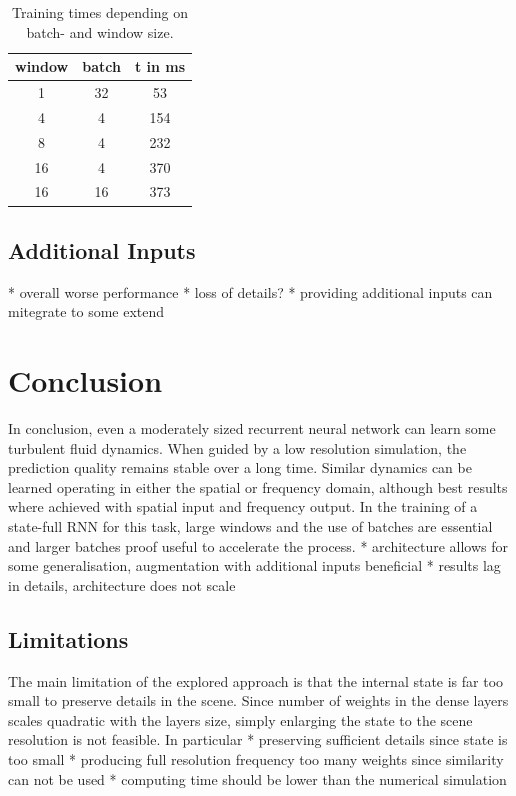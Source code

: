 \documentclass[sigconf]{acmart}
\begin{document}
\begin{table}
	\centering
	\caption{Training times depending on batch- and window size.}
	\label{tab:bwsize}
	\begin{tabular}{ccc}
		\hline
		window  & batch  & t in ms \\ \hline
		1  & 32 &   53    \\
		4  & 4  &   154   \\
		8  & 4  &   232   \\
		16 & 4  &   370   \\
		16 & 16 &   373   \\ \hline
	\end{tabular}
\end{table}
\subsection{Additional Inputs}
* overall worse performance
* loss of details?
* providing additional inputs can mitegrate to some extend
\section{Conclusion}
In conclusion, even a moderately sized recurrent neural network can learn some turbulent fluid dynamics. When guided by a low resolution simulation, the prediction quality remains stable over a long time.
Similar dynamics can be learned operating in either the spatial or frequency domain, although best results where achieved with spatial input and frequency output.
In the training of a state-full RNN for this task, large windows and the use of batches are essential and larger batches proof useful to accelerate the process.
* architecture allows for some generalisation, augmentation with additional inputs beneficial
* results lag in details, architecture does not scale
\subsection{Limitations}
The main limitation of the explored approach is that the internal state is far too small to preserve details in the scene. Since number of weights in the dense layers scales quadratic with the layers size, simply enlarging the state to the scene resolution is not feasible.
In particular 
* preserving sufficient details since state is too small
* producing full resolution frequency too many weights since similarity can not be used
* computing time should be lower than the numerical simulation
\end{document}
